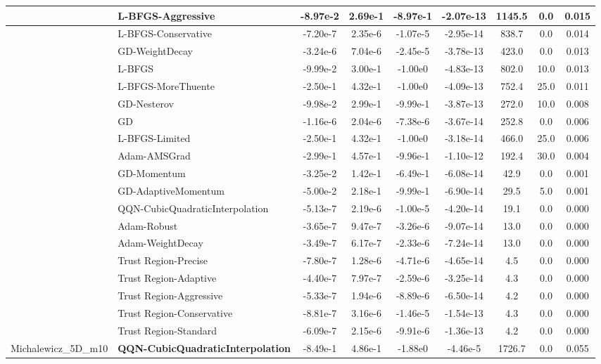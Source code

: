 \documentclass{article}
\begin{document}
\begin{longtable}{|l|l|c|c|c|c|c|c|c|}
\hline
 & L-BFGS-Aggressive & -8.97e-2 & 2.69e-1 & -8.97e-1 & -2.07e-13 & 1145.5 & 0.0 & 0.015 \\
\hline
 & L-BFGS-Conservative & -7.20e-7 & 2.35e-6 & -1.07e-5 & -2.95e-14 & 838.7 & 0.0 & 0.014 \\
\hline
 & GD-WeightDecay & -3.24e-6 & 7.04e-6 & -2.45e-5 & -3.78e-13 & 423.0 & 0.0 & 0.013 \\
\hline
 & L-BFGS & -9.99e-2 & 3.00e-1 & -1.00e0 & -4.83e-13 & 802.0 & 10.0 & 0.013 \\
\hline
 & L-BFGS-MoreThuente & -2.50e-1 & 4.32e-1 & -1.00e0 & -4.09e-13 & 752.4 & 25.0 & 0.011 \\
\hline
 & GD-Nesterov & -9.98e-2 & 2.99e-1 & -9.99e-1 & -3.87e-13 & 272.0 & 10.0 & 0.008 \\
\hline
 & GD & -1.16e-6 & 2.04e-6 & -7.38e-6 & -3.67e-14 & 252.8 & 0.0 & 0.006 \\
\hline
 & L-BFGS-Limited & -2.50e-1 & 4.32e-1 & -1.00e0 & -3.18e-14 & 466.0 & 25.0 & 0.006 \\
\hline
 & Adam-AMSGrad & -2.99e-1 & 4.57e-1 & -9.96e-1 & -1.10e-12 & 192.4 & 30.0 & 0.004 \\
\hline
 & GD-Momentum & -3.25e-2 & 1.42e-1 & -6.49e-1 & -6.08e-14 & 42.9 & 0.0 & 0.001 \\
\hline
 & GD-AdaptiveMomentum & -5.00e-2 & 2.18e-1 & -9.99e-1 & -6.90e-14 & 29.5 & 5.0 & 0.001 \\
\hline
 & QQN-CubicQuadraticInterpolation & -5.13e-7 & 2.19e-6 & -1.00e-5 & -4.20e-14 & 19.1 & 0.0 & 0.000 \\
\hline
 & Adam-Robust & -3.65e-7 & 9.47e-7 & -3.26e-6 & -9.07e-14 & 13.0 & 0.0 & 0.000 \\
\hline
 & Adam-WeightDecay & -3.49e-7 & 6.17e-7 & -2.33e-6 & -7.24e-14 & 13.0 & 0.0 & 0.000 \\
\hline
 & Trust Region-Precise & -7.80e-7 & 1.28e-6 & -4.71e-6 & -4.65e-14 & 4.5 & 0.0 & 0.000 \\
\hline
 & Trust Region-Adaptive & -4.40e-7 & 7.97e-7 & -2.59e-6 & -3.25e-14 & 4.3 & 0.0 & 0.000 \\
\hline
 & Trust Region-Aggressive & -5.33e-7 & 1.94e-6 & -8.89e-6 & -6.50e-14 & 4.2 & 0.0 & 0.000 \\
\hline
 & Trust Region-Conservative & -8.81e-7 & 3.16e-6 & -1.46e-5 & -1.54e-13 & 4.3 & 0.0 & 0.000 \\
\hline
 & Trust Region-Standard & -6.09e-7 & 2.15e-6 & -9.91e-6 & -1.36e-13 & 4.2 & 0.0 & 0.000 \\
Michalewicz\_5D\_m10 & \textbf{QQN-CubicQuadraticInterpolation} & -8.49e-1 & 4.86e-1 & -1.88e0 & -4.46e-5 & 1726.7 & 0.0 & 0.055 \\

\end{longtable}
\end{document}
